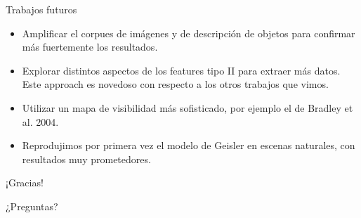 \documentclass[compress]{beamer}
\begin{document}
\begin{frame}{Trabajos futuros}
\begin{itemize}
\item Amplificar el corpues de imágenes y de descripción de objetos para confirmar más fuertemente los resultados.
\item Explorar distintos aspectos de los features tipo II para extraer más datos. Este approach es novedoso con respecto a los otros trabajos que vimos.
\item Utilizar un mapa de visibilidad más sofisticado, por ejemplo el de Bradley et al. 2004.
\item Reprodujimos por primera vez el modelo de Geisler en escenas naturales, con resultados muy prometedores.
\end{itemize}
\end{frame}


\begin{frame}
\begin{center}
\Huge ¡Gracias!

\bigskip

\huge ¿Preguntas?
\end{center}
\end{frame}
\end{document}

